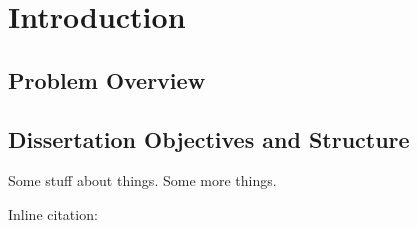 \chapter{Introduction}
\label{chapterlabel1}

\section{Problem Overview}

\section{Dissertation Objectives and Structure}



Some stuff about things.\cite{example-citation} Some more things. 

Inline citation: 

\blindtext
